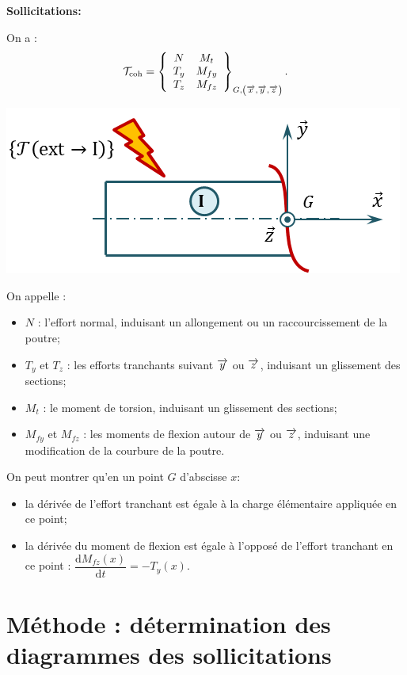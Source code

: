 \documentclass[10pt,fleqn]{article} %
\begin{document}
\begin{defi}
\textbf{Sollicitations:} ~\\

\begin{minipage}[c]{.65\linewidth}
On a : 
$$
\mathcal{T}_{\text{coh}} = \torseurcol{N}{T_y}{T_z}{M_t}{M_{fy}}{M_{fz}}{G,\left(\vx{}, \vy{}, \vz{} \right)}.
$$
\end{minipage} \hfill
\begin{minipage}[c]{.3\linewidth}
\begin{center}
\includegraphics[width=\linewidth]{images/sollicitations}
\end{center}
\end{minipage}

On appelle :
\begin{itemize}
\item $N$ : l'effort normal, induisant un allongement ou un raccourcissement de la poutre;
\item $T_y$ et $T_z$ : les efforts tranchants suivant $\vy{}$ ou $\vz{}$, induisant un glissement des sections;
\item $M_{t}$ : le moment de torsion, induisant un glissement des sections; 
\item $M_{fy}$ et $M_{fz}$ : les moments de flexion autour de $\vy{}$ ou $\vz{}$, induisant une modification de la courbure de la poutre.
\end{itemize}

\end{defi}


\begin{rem}
On peut montrer qu'en un point $G$ d'abscisse $x$:
\begin{itemize}
\item la dérivée de l'effort tranchant est égale à la charge élémentaire appliquée en ce point;
\item la dérivée du moment de flexion est égale à l'opposé de l'effort tranchant en ce point : $\dfrac{\text{d}M_{fz}(x)}{\text{d}t}=-T_y(x)$.
\end{itemize}
\end{rem}

\section{Méthode : détermination des diagrammes des sollicitations}
\end{document}
